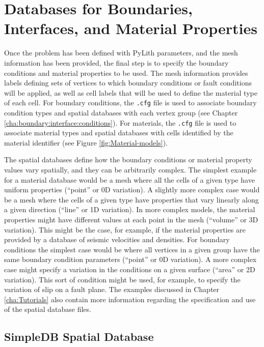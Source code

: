 \section{\label{sec:spatial:databases}Databases for Boundaries, Interfaces,
and Material Properties}

Once the problem has been defined with PyLith parameters, and the
mesh information has been provided, the final step is to specify the
boundary conditions and material properties to be used. The mesh information
provides labels defining sets of vertices to which boundary conditions
or fault conditions will be applied, as well as cell labels that will
be used to define the material type of each cell. For boundary conditions,
the \texttt{.cfg} file is used to associate boundary condition types
and spatial databases with each vertex group (see Chapter \vref{cha:boundary:interface:conditions}).
For materials, the \texttt{.cfg} file is used to associate material
types and spatial databases with cells identified by the material
identifier (see Figure \vref{fig:Material-models}).

The spatial databases define how the boundary conditions or material
property values vary spatially, and they can be arbitrarily complex.
The simplest example for a material database would be a mesh where
all the cells of a given type have uniform properties (``point''
or 0D variation). A slightly more complex case would be a mesh where
the cells of a given type have properties that vary linearly along
a given direction (``line'' or 1D variation). In more complex models,
the material properties might have different values at each point
in the mesh (``volume'' or 3D variation). This might be the case,
for example, if the material properties are provided by a database
of seismic velocities and densities. For boundary conditions the simplest
case would be where all vertices in a given group have the same boundary
condition parameters (``point'' or 0D variation). A more complex
case might specify a variation in the conditions on a given surface
(``area'' or 2D variation). This sort of condition might be used,
for example, to specify the variation of slip on a fault plane. The
examples discussed in Chapter \vref{cha:Tutorials} also contain more
information regarding the specification and use of the spatial database
files.


\subsection{SimpleDB Spatial Database}

